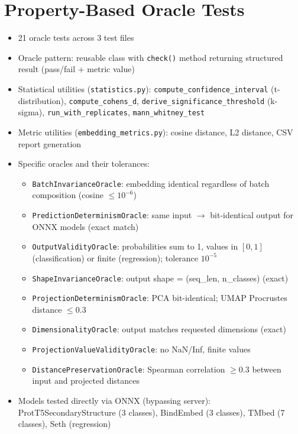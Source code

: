 \section{Property-Based Oracle Tests}\label{sec:oracle-tests}
\begin{itemize}
  \item 21 oracle tests across 3 test files
  \item Oracle pattern: reusable class with \texttt{check()} method returning structured result (pass/fail + metric value)
  \item Statistical utilities (\texttt{statistics.py}): \texttt{compute\_confidence\_interval} (t-distribution), \texttt{compute\_cohens\_d}, \texttt{derive\_significance\_threshold} (k-sigma), \texttt{run\_with\_replicates}, \texttt{mann\_whitney\_test}
  \item Metric utilities (\texttt{embedding\_metrics.py}): cosine distance, L2 distance, CSV report generation
  \item Specific oracles and their tolerances:
    \begin{itemize}
      \item \texttt{BatchInvarianceOracle}: embedding identical regardless of batch composition (cosine $\leq 10^{-6}$)
      \item \texttt{PredictionDeterminismOracle}: same input $\to$ bit-identical output for ONNX models (exact match)
      \item \texttt{OutputValidityOracle}: probabilities sum to 1, values in $[0,1]$ (classification) or finite (regression); tolerance $10^{-5}$
      \item \texttt{ShapeInvarianceOracle}: output shape = (seq\_len, n\_classes) (exact)
      \item \texttt{ProjectionDeterminismOracle}: PCA bit-identical; UMAP Procrustes distance $\leq 0.3$
      \item \texttt{DimensionalityOracle}: output matches requested dimensions (exact)
      \item \texttt{ProjectionValueValidityOracle}: no NaN/Inf, finite values
      \item \texttt{DistancePreservationOracle}: Spearman correlation $\geq 0.3$ between input and projected distances
    \end{itemize}
  \item Models tested directly via ONNX (bypassing server): ProtT5SecondaryStructure (3 classes), BindEmbed (3 classes), TMbed (7 classes), Seth (regression)
\end{itemize}

